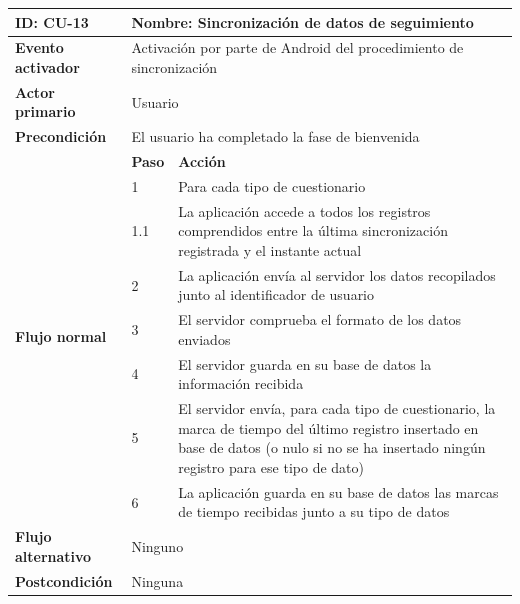             \begin{table}[h]
                \centering
                \begin{tabularx}{\textwidth}{|l|l|X|}
                    \hline
                    \textbf{ID:} CU-13 & \multicolumn{2}{|X|}{\textbf{Nombre}: Sincronización de datos de seguimiento} \\
                    \hline
                    \textbf{Evento activador} & \multicolumn{2}{|X|}{Activación por parte de Android del procedimiento de sincronización} \\
                    \hline
                    \textbf{Actor primario} & \multicolumn{2}{|X|}{Usuario} \\
                    \hline
                    \textbf{Precondición} & \multicolumn{2}{|X|}{El usuario ha completado la fase de bienvenida} \\
                    \hline
                    \multirow{8}{*}{\textbf{Flujo normal}} & \textbf{Paso} & \textbf{Acción} \\
                    \cline{2-3} & 1 & Para cada tipo de cuestionario \\
                    \cline{2-3} & 1.1 & La aplicación accede a todos los registros comprendidos entre la última sincronización registrada y el instante actual \\
                    \cline{2-3} & 2 & La aplicación envía al servidor los datos recopilados junto al identificador de usuario \\
                    \cline{2-3} & 3 & El servidor comprueba el formato de los datos enviados \\
                    \cline{2-3} & 4 & El servidor guarda en su base de datos la información recibida \\
                    \cline{2-3} & 5 & El servidor envía, para cada tipo de cuestionario, la marca de tiempo del último registro insertado en base de datos (o nulo si no se ha insertado ningún registro para ese tipo de dato) \\
                    \cline{2-3} & 6 & La aplicación guarda en su base de datos las marcas de tiempo recibidas junto a su tipo de datos \\
                    \hline
                    \textbf{Flujo alternativo} & \multicolumn{2}{|X|}{Ninguno} \\
                    \hline
                    \textbf{Postcondición} & \multicolumn{2}{|X|}{Ninguna} \\
                    \hline

\end{tabularx}
\end{table}
